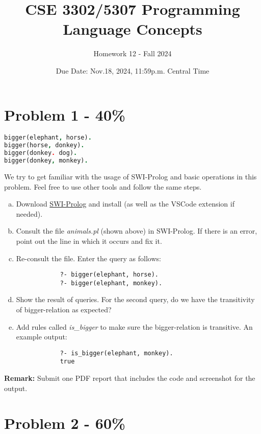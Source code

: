 \documentclass{article}
\newcommand{\answerboxbig}{
    \vspace{20cm} %
}
\begin{document}
\title{CSE 3302/5307 Programming Language Concepts}
\author{Homework 12 - Fall 2024}
\date{Due Date: Nov.18, 2024, 11:59p.m. Central Time}
\maketitle
\thispagestyle{fancy}


\section*{Problem 1 - 40\%}

\begin{lstlisting}[language=Prolog]
bigger(elephant, horse).
bigger(horse, donkey).
bigger(donkey. dog).
bigger(donkey, monkey).
\end{lstlisting}

	We try to get familiar with the usage of SWI-Prolog and basic operations in this problem. Feel free to use other tools and follow the same steps.
	\begin{enumerate}[(a)]
		\item Download \href{http://www.swi-prolog.org/}{SWI-Prolog} and install (as well as the VSCode extension if needed).
		\item Consult the file \textit{animals.pl} (shown above) in SWI-Prolog. If there is an error, point out the line in which it occurs and fix it. 
		\item Re-consult the file. Enter the query as follows:
		
		\begin{verbatim}
			?- bigger(elephant, horse).
			?- bigger(elephant, monkey).
		\end{verbatim}
		\item Show the result of queries. For the second query, do we have the transitivity of bigger-relation as expected?
		\item Add rules called \textit{is\_bigger} to make sure the bigger-relation is transitive. An example output:
		\begin{verbatim}
			?- is_bigger(elephant, monkey).
			true
		\end{verbatim}
	\end{enumerate}
	\textbf{Remark:} 
    Submit one PDF report that includes the code and screenshot for the output.

\answerboxbig


\section*{Problem 2 - 60\%}
\end{document}
